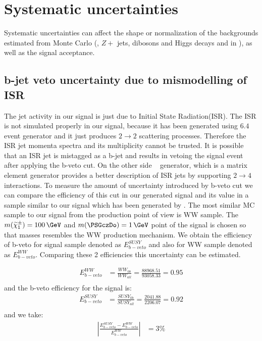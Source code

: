 \section{Systematic uncertainties}
\label{sect:sys}
Systematic uncertainties can affect the shape or normalization of the
backgrounds estimated from Monte Carlo (\ttbar, $Z+$ jets, dibosons and Higgs decays and \wjets in \tauTau \bintwo), 
as well as the signal acceptance. 

\subsection{b-jet veto uncertainty due to mismodelling of ISR}
The jet activity in our signal is just due to Initial State Radiation(ISR). The ISR is not simulated properly in our signal, because it has been generated using \PYTHIA $6.4$ event generator and it just produces $2 \rightarrow 2$ scattering processes. Therefore the ISR jet momenta spectra and its multiplicity cannot be trusted. It is possible that an ISR jet is mistagged as a b-jet and results in vetoing the signal event after applying the b-veto cut. On the other side \MADGRAPH ~\cite{MADGRAPH} generator, which is a matrix element generator provides a better description of ISR jets by supporting $2 \rightarrow 4$ interactions. To measure the amount of uncertainty introduced by b-veto cut we can compare the efficiency of this cut in our generated signal and its value in a sample similar to our signal which has been generated by \MADGRAPH. 
The most similar MC sample to our signal from the production point of view is WW sample. The $m(\chione) = 100\,\GeV$ and $m(\PSGczDo) = 1\,\GeV$ point of the signal is chosen so that masses resembles the WW production mechanism. %
We obtain the efficiency of b-veto for signal sample denoted as $E^{SUSY}_{b-veto}$ and also for WW sample denoted as $E^{WW}_{b-veto}$.
Comparing these 2 efficiencies this uncertainty can be estimated.

\begin{align}
E^{WW}_{b-veto} &= \frac{WW_{0b}}{WW_{all}} = \frac{88968.51}{93058.33} = 0.95\\ \nonumber
\end{align}
and the b-veto efficiency for the signal is:
\begin{align}
E^{SUSY}_{b-veto} &= \frac{SUSY_{0b}}{SUSY_{all}} = \frac{2041.88}{2206.07} = 0.92 \\ \nonumber
\end{align}
and we take:
\begin{align}
|\frac{E^{SUSY}_{b-veto}-E^{WW}_{b-veto}}{E^{WW}_{b-veto}}| &= 3 \% \\ \nonumber
\end{align}

